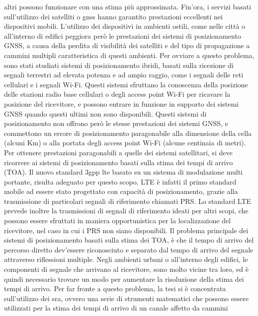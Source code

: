 altri possono funzionare con una stima pi\`u approssimata.
Fin'ora, i servizi basati sull'utilizzo dei satelliti o \gls{gnss} hanno garantito prestazioni eccellenti 
nei dispositivi mobili. L'utilizzo dei dispositivi in ambienti ostili, come 
nelle citt\`a o all'interno di edifici peggiora per\`o le prestazioni dei sistemi di posizionamento GNSS, a causa 
della perdita di visibilit\`a dei satelliti e del tipo di propagazione a cammini multipli caratteristica 
di questi ambienti. Per ovviare a questo problema, sono stati studiati sistemi di 
posizionamento ibridi, basati sulla ricezione di segnali terrestri ad elevata potenza e ad ampio raggio,
come i segnali delle reti cellulari e i segnali Wi-Fi. Questi sistemi sfruttano la conoscenza della posizione delle 
stazioni radio base cellulari o degli access point Wi-Fi per ricavare la posizione del ricevitore, e possono 
entrare in funzione in supporto dei sistemi GNSS quando questi ultimi non sono disponibili. 
Questi sistemi di posizionamento non offrono per\`o 
le stesse prestazioni dei sistemi GNSS, e commettono un errore di posizionamento paragonabile alla dimensione della cella 
(alcuni Km) o alla portata degli access point Wi-Fi (alcune centinaia di metri). 
Per ottenere prestazioni paragonabili a quelle dei sistemi satellitari, si deve ricorrere ai sistemi di 
posizionamento basati sulla stima dei tempi di arrivo (TOA). 
Il nuovo standard \gls{3gpp} \gls{lte} basato su  un sistema di modulazione multi portante, risulta 
adeguato per questo scopo. LTE \`e infatti il primo standard mobile ad essere stato progettato con 
capacit\`a di posizionamento, grazie  alla trasmissione di particolari segnali di riferimento chiamati 
PRS. Lo standard LTE prevede inoltre la trasmissioni di segnali di riferimento ideati per altri scopi,
che possono essere sfruttati in maniera opportunistica per la localizzazione del ricevitore, 
nel caso in cui i PRS non siano disponibili. 
Il problema principale dei sistemi di posizionamento basati sulla stima dei TOA, \`e che il tempo di arrivo
del percorso diretto dev'essere riconosciuto e separato dal tempo di arrivo del segnale attraverso 
riflessioni multiple. Negli ambienti urbani o all'interno degli edifici, le componenti di segnale che arrivano al 
ricevitore, sono molto vicine tra loro, ed \`e quindi necessario trovare un modo per aumentare
la risoluzione della stima dei tempi di arrivo.
Per far fronte a questo problema, la tesi si \`e concentrata sull'utilizzo dei \gls{sra}, ovvero una serie
di strumenti matematici che possono essere utilizzati per la stima dei tempi di arrivo di un canale affetto da cammini 
